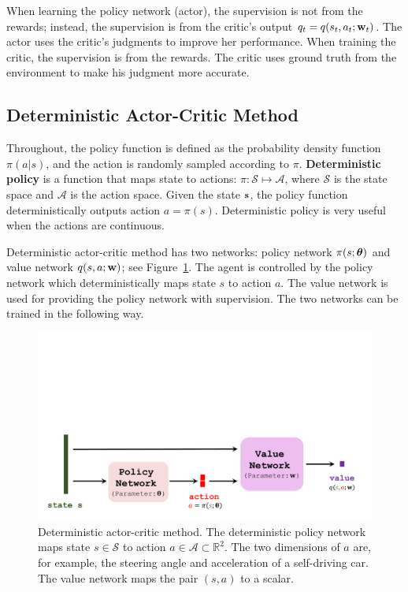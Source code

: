 \documentclass[11pt]{article}
\numberwithin{equation}{section}
\def\s{{\bf s}}
\def\w{{\bf w}}
\def\AM{{\mathcal A}}
\def\SM{{\mathcal S}}
\def\RB{{\mathbb R}}
\def\tha{\mbox{\boldmath$\theta$\unboldmath}}
\begin{document}
When learning the policy network (actor), the supervision is not from the rewards; instead, the supervision is from the critic's output $q_t = q (s_t , a_t ; \w_t )$.
The actor uses the critic's judgments to improve her performance.
When training the critic, the supervision is from the rewards.
The critic uses ground truth from the environment to make his judgment more accurate.



\subsection{Deterministic Actor-Critic Method}  \label{sec:actor_critic_det}


Throughout, the policy function is defined as the probability density function $\pi (a | s)$, and the action is randomly sampled according to $\pi$.
\textbf{Deterministic policy} is a function that maps state to actions: $\pi: \SM \mapsto \AM$,
where $\SM $ is the state space and $\AM$ is the action space.
Given the state $\s$, the policy function deterministically outputs action $a = \pi (s)$.
Deterministic policy is very useful when the actions are continuous.



Deterministic actor-critic method \cite{silver2014deterministic} has two networks: policy network $\pi (s; \tha )$ and value network $q (s, a ; \w)$; see Figure~\ref{fig:dpg}.
The agent is controlled by the policy network which deterministically maps state $s$ to action $a$.
The value network is used for providing the policy network with supervision.
The two networks can be trained in the following way.

\begin{figure}[!h]
    \centering
    \includegraphics[width=0.8\linewidth]{figures/DPG.pdf}
    \caption{Deterministic actor-critic method.
    The deterministic policy network maps state $s \in \SM$ to action $a \in \AM \subset \RB^2$.
    The two dimensions of $a$ are, for example, the steering angle and acceleration of a self-driving car.
    The value network maps the pair $(s, a)$ to a scalar.
    }
    \label{fig:dpg}
\end{figure}
\end{document}
